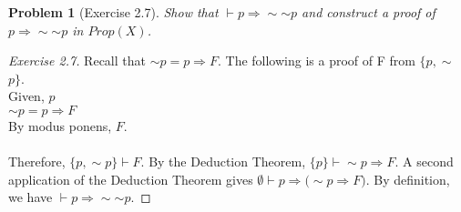 \documentclass{article}
\theoremstyle{problemstyle}
\newtheorem{problem}{Problem}
\begin{document}
\begin{problem}[Exercise 2.7]
Show that  $\vdash p\Rightarrow \sim$$\sim$$p$ and construct a proof of $p \Rightarrow \sim$$\sim$$p$ in $Prop(X)$. 
\end{problem}
\begin{proof}[Exercise 2.7]
Recall that $\sim$$p = p\Rightarrow F$. The following is a proof of F from $\{p,\sim$$p\}$. \\Given, $p$\\$\sim$$p = p \Rightarrow F$\\By modus ponens, $F$.\\\\ Therefore,  $\{p,\sim$$p\}\vdash F$. By the Deduction Theorem, $\{p\}\vdash \sim$$p\Rightarrow F$. A second application of the Deduction Theorem gives $\emptyset\vdash p\Rightarrow(\sim$$p\Rightarrow F)$. By definition, we have $\vdash p\Rightarrow\sim$$\sim$$p$. 
\end{proof}
\end{document}
